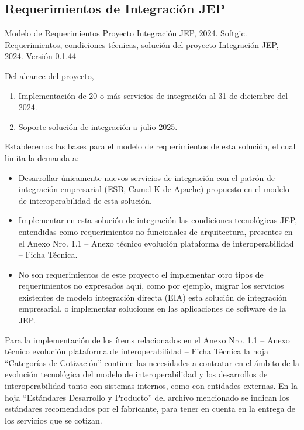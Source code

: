 \documentclass[
  paper=a4,
  ,captions=tableheading
]{scrartcl}
\providecommand{\tightlist}{%
  \setlength{\itemsep}{0pt}\setlength{\parskip}{0pt}}
\renewenvironment{quote}{\begin{customblockquote}\list{}{\rightmargin=0em\leftmargin=0em}%
\item\relax\color{blockquote-text}\ignorespaces}{\unskip\unskip\endlist\end{customblockquote}}
\begin{document}
\subsection{Requerimientos de Integración
JEP}\label{sec:requerimientos-de-integraciuxf3n-jep-1}

\begin{quote}
Modelo de Requerimientos Proyecto Integración JEP, 2024. Softgic.
Requerimientos, condiciones técnicas, solución del proyecto Integración
JEP, 2024. Versión 0.1.44
\end{quote}

Del alcance del proyecto,

\begin{enumerate}
\def\labelenumi{\arabic{enumi}.}
\tightlist
\item
  Implementación de 20 o más servicios de integración al 31 de diciembre
  del 2024.
\item
  Soporte solución de integración a julio 2025.
\end{enumerate}

Establecemos las bases para el modelo de requerimientos de esta
solución, el cual limita la demanda a:

\begin{itemize}
\tightlist
\item
  Desarrollar únicamente nuevos servicios de integración con el patrón
  de integración empresarial (ESB, Camel K de Apache) propuesto en el
  modelo de interoperabilidad de esta solución.
\item
  Implementar en esta solución de integración las condiciones
  tecnológicas JEP, entendidas como requerimientos no funcionales de
  arquitectura, presentes en el Anexo Nro. 1.1 -- Anexo técnico
  evolución plataforma de interoperabilidad -- Ficha Técnica.
\item
  No son requerimientos de este proyecto el implementar otro tipos de
  requerimientos no expresados aquí, como por ejemplo, migrar los
  servicios existentes de modelo integración directa (EIA) esta solución
  de integración empresarial, o implementar soluciones en las
  aplicaciones de software de la JEP.
\end{itemize}

Para la implementación de los ítems relacionados en el Anexo Nro. 1.1 --
Anexo técnico evolución plataforma de interoperabilidad -- Ficha Técnica
la hoja ``Categorías de Cotización'' contiene las necesidades a
contratar en el ámbito de la evolución tecnológica del modelo de
interoperabilidad y los desarrollos de interoperabilidad tanto con
sistemas internos, como con entidades externas. En la hoja ``Estándares
Desarrollo y Producto'' del archivo mencionado se indican los estándares
recomendados por el fabricante, para tener en cuenta en la entrega de
los servicios que se cotizan.
\end{document}
